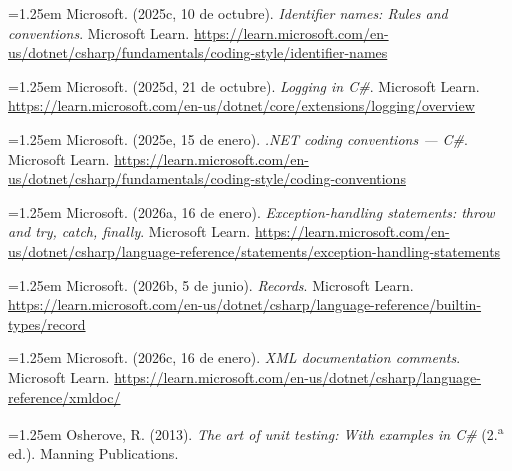 \smallskip
\noindent\hangindent=1.25em Microsoft. (2025c, 10 de octubre). \textit{Identifier names: Rules and conventions}. Microsoft Learn. \url{https://learn.microsoft.com/en-us/dotnet/csharp/fundamentals/coding-style/identifier-names}

\smallskip
\noindent\hangindent=1.25em Microsoft. (2025d, 21 de octubre). \textit{Logging in C\#}. Microsoft Learn. \url{https://learn.microsoft.com/en-us/dotnet/core/extensions/logging/overview}

\smallskip
\noindent\hangindent=1.25em Microsoft. (2025e, 15 de enero). \textit{.NET coding conventions --- C\#}. Microsoft Learn. \url{https://learn.microsoft.com/en-us/dotnet/csharp/fundamentals/coding-style/coding-conventions}

\smallskip
\noindent\hangindent=1.25em Microsoft. (2026a, 16 de enero). \textit{Exception-handling statements: throw and try, catch, finally}. Microsoft Learn. \url{https://learn.microsoft.com/en-us/dotnet/csharp/language-reference/statements/exception-handling-statements}

\smallskip
\noindent\hangindent=1.25em Microsoft. (2026b, 5 de junio). \textit{Records}. Microsoft Learn. \url{https://learn.microsoft.com/en-us/dotnet/csharp/language-reference/builtin-types/record}

\smallskip
\noindent\hangindent=1.25em Microsoft. (2026c, 16 de enero). \textit{XML documentation comments}. Microsoft Learn. \url{https://learn.microsoft.com/en-us/dotnet/csharp/language-reference/xmldoc/}

\smallskip
\noindent\hangindent=1.25em Osherove, R. (2013). \textit{The art of unit testing: With examples in C\#} (2.\textsuperscript{a} ed.). Manning Publications.
